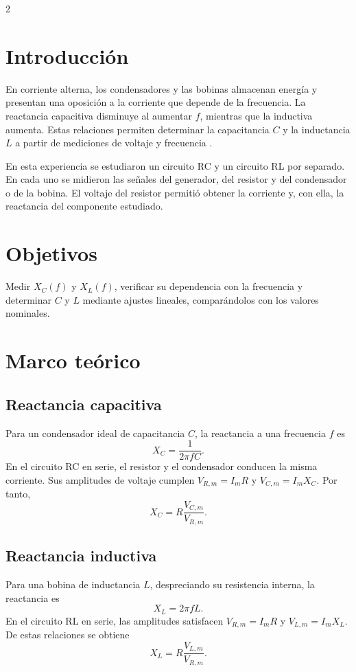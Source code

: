 \documentclass[10pt,letterpaper]{article}
\begin{document}
\begin{multicols}{2}\raggedcolumns
\section{Introducción}
En corriente alterna, los condensadores y las bobinas almacenan energía y presentan una oposición a la corriente que depende de la frecuencia. La reactancia capacitiva disminuye al aumentar $f$, mientras que la inductiva aumenta. Estas relaciones permiten determinar la capacitancia $C$ y la inductancia $L$ a partir de mediciones de voltaje y frecuencia \cite{young2009}.

En esta experiencia se estudiaron un circuito RC y un circuito RL por separado. En cada uno se midieron las señales del generador, del resistor y del condensador o de la bobina. El voltaje del resistor permitió obtener la corriente y, con ella, la reactancia del componente estudiado.

\begin{minipage}{\linewidth}
\section{Objetivos}
Medir $X_C(f)$ y $X_L(f)$, verificar su dependencia con la frecuencia y determinar $C$ y $L$ mediante ajustes lineales, comparándolos con los valores nominales.
\end{minipage}\par

\section{Marco teórico}
\subsection{Reactancia capacitiva}
Para un condensador ideal de capacitancia $C$, la reactancia a una frecuencia $f$ es
\begin{equation}
 X_C=\frac{1}{2\pi fC}.
 \label{eq:reactanciaC}
\end{equation}
En el circuito RC en serie, el resistor y el condensador conducen la misma corriente. Sus amplitudes de voltaje cumplen $V_{R,m}=I_mR$ y $V_{C,m}=I_mX_C$. Por tanto,
\begin{equation}
 X_C=R\frac{V_{C,m}}{V_{R,m}}.
 \label{eq:ratioC}
\end{equation}

\subsection{Reactancia inductiva}
Para una bobina de inductancia $L$, despreciando su resistencia interna, la reactancia es
\begin{equation}
 X_L=2\pi fL.
 \label{eq:reactanciaL}
\end{equation}
En el circuito RL en serie, las amplitudes satisfacen $V_{R,m}=I_mR$ y $V_{L,m}=I_mX_L$. De estas relaciones se obtiene
\begin{equation}
 X_L=R\frac{V_{L,m}}{V_{R,m}}.
 \label{eq:ratioL}
\end{equation}
\end{multicols}
\end{document}
